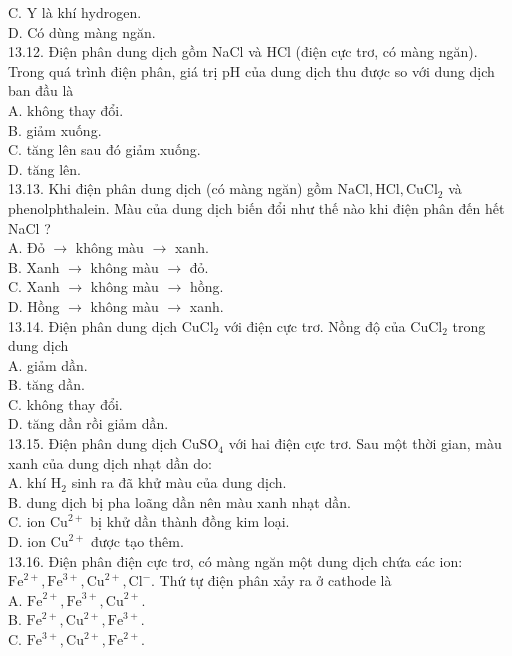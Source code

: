 \documentclass[10pt]{article}
\begin{document}
C. Y là khí hydrogen.\\
D. Có dùng màng ngăn.\\
13.12. Điện phân dung dịch gồm NaCl và HCl (điện cực trơ, có màng ngăn). Trong quá trình điện phân, giá trị pH của dung dịch thu được so với dung dịch ban đầu là\\
A. không thay đổi.\\
B. giảm xuống.\\
C. tăng lên sau đó giảm xuống.\\
D. tăng lên.\\
13.13. Khi điện phân dung dịch (có màng ngăn) gồm $\mathrm{NaCl}, \mathrm{HCl}, \mathrm{CuCl}_{2}$ và phenolphthalein. Màu của dung dịch biến đổi như thế nào khi điện phân đến hết NaCl ?\\
A. Đỏ $\rightarrow$ không màu $\rightarrow$ xanh.\\
B. Xanh $\rightarrow$ không màu $\rightarrow$ đỏ.\\
C. Xanh $\rightarrow$ không màu $\rightarrow$ hồng.\\
D. Hồng $\rightarrow$ không màu $\rightarrow$ xanh.\\
13.14. Điện phân dung dịch $\mathrm{CuCl}_{2}$ với điện cực trơ. Nồng độ của $\mathrm{CuCl}_{2}$ trong dung dịch\\
A. giảm dần.\\
B. tăng dần.\\
C. không thay đổi.\\
D. tăng dần rồi giảm dần.\\
13.15. Điện phân dung dịch $\mathrm{CuSO}_{4}$ với hai điện cực trơ. Sau một thời gian, màu xanh của dung dịch nhạt dần do:\\
A. khí $\mathrm{H}_{2}$ sinh ra đã khử màu của dung dịch.\\
B. dung dịch bị pha loãng dần nên màu xanh nhạt dần.\\
C. ion $\mathrm{Cu}^{2+}$ bị khử dần thành đồng kim loại.\\
D. ion $\mathrm{Cu}^{2+}$ được tạo thêm.\\
13.16. Điện phân điện cực trơ, có màng ngăn một dung dịch chứa các ion: $\mathrm{Fe}^{2+}, \mathrm{Fe}^{3+}, \mathrm{Cu}^{2+}, \mathrm{Cl}^{-}$. Thứ tự điện phân xảy ra ở cathode là\\
A. $\mathrm{Fe}^{2+}, \mathrm{Fe}^{3+}, \mathrm{Cu}^{2+}$.\\
B. $\mathrm{Fe}^{2+}, \mathrm{Cu}^{2+}, \mathrm{Fe}^{3+}$.\\
C. $\mathrm{Fe}^{3+}, \mathrm{Cu}^{2+}, \mathrm{Fe}^{2+}$.\\
\end{document}
